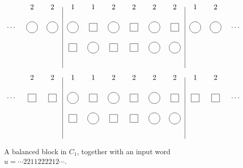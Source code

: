\documentclass[reqno]{amsart}
\newcommand{\0}{\phantom{c}}
\theoremstyle{plain}
\theoremstyle{definition}
\numberwithin{equation}{section}
\begin{document}
\begin{figure}
\[
\begin{tikzpicture}
\draw (-0.5,6)--(-0.5,3);
\draw (5.5,6)--(5.5,3);
  \node at(-2,6){2};
  \node at(-1,6){2};
  \node at (0,6){1};
  \node at (1,6){1};
  \node at (2,6){2};
  \node at (3,6){2};
  \node at (4,6){2};
  \node at (5,6){2};
  \node at (6,6){1};
  \node at (7,6){2};
  \node[circle,draw=black] at (0, 5){\0};
  \node[rectangle,draw=black] at (1, 5){\0};
  \node[circle,draw=black] at (2, 5){\0};
  \node[rectangle, draw=black] at (3, 5){\0};
  \node[circle,draw=black] at (4, 5){\0};
  \node[rectangle,draw=black] at (5, 5){\0};
  \node[rectangle,draw=black] at (0, 4){\0};
  \node[circle, draw=black] at (1, 4){\0};
  \node[rectangle,draw=black] at (2, 4){\0};
  \node[rectangle,draw=black] at (3, 4){\0};
  \node[circle,draw=black] at (4, 4){\0};
  \node[circle, draw=black] at (5, 4){\0};
  \node[circle,draw=black] at (-1, 5){\0};
  \node[circle,draw=black] at (-2, 5){\0};
  \node at (-3,5){\dots};
  \node[circle,draw=black] at (6, 5){\0};
  \node[circle,draw=black] at (7, 5){\0};
  \node at (8,5){\dots};
\end{tikzpicture}
\]
\[
\begin{tikzpicture}
  \node at(-2,6){2};
  \node at(-1,6){2};
  \node at (0,6){1};
  \node at (1,6){1};
  \node at (2,6){2};
  \node at (3,6){2};
  \node at (4,6){2};
  \node at (5,6){2};
  \node at (6,6){1};
  \node at (7,6){2};

\draw (-0.5,6)--(-0.5,3);
\draw (5.5,6)--(5.5,3);
  \node[circle,draw=black] at (0, 5){\0};
  \node[rectangle,draw=black] at (1, 5){\0};
  \node[circle,draw=black] at (2, 5){\0};
  \node[rectangle, draw=black] at (3, 5){\0};
  \node[circle,draw=black] at (4, 5){\0};
  \node[rectangle,draw=black] at (5, 5){\0};

  \node[rectangle,draw=black] at (0, 4){\0};
  \node[circle, draw=black] at (1, 4){\0};
  \node[rectangle,draw=black] at (2, 4){\0};
  \node[rectangle,draw=black] at (3, 4){\0};
  \node[circle,draw=black] at (4, 4){\0};
  \node[circle, draw=black] at (5, 4){\0};
  
  \node[rectangle,draw=black] at (-1, 5){\0};
  \node[rectangle,draw=black] at (-2, 5){\0};
  \node at (-3,5){$\dotsm$};

  \node[rectangle,draw=black] at (6, 5){\0};
  \node[rectangle,draw=black] at (7, 5){\0};
  \node at (8,5){$\dotsm$};
\end{tikzpicture}
\]
\caption{A balanced block in $C_1$, together with an input word $u = \dotsm 2211222212 \dotsm$.}
\end{figure}
\end{document}
